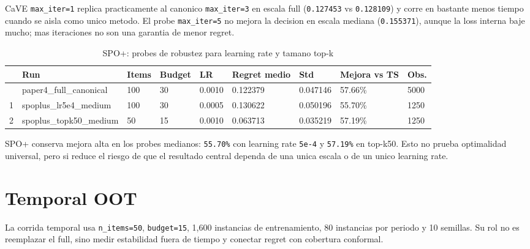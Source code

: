 \documentclass[
  spanish,
  11pt,
  letterpaper,
]{scrbook}
\theoremstyle{plain}
\theoremstyle{remark}
\begin{document}
CaVE \texttt{max\_iter=1} replica practicamente al canonico
\texttt{max\_iter=3} en escala full (\texttt{0.127453} vs
\texttt{0.128109}) y corre en bastante menos tiempo cuando se aisla como
unico metodo. El probe \texttt{max\_iter=5} no mejora la decision en
escala mediana (\texttt{0.155371}), aunque la loss interna baje mucho;
mas iteraciones no son una garantia de menor regret.

{

\begin{longtable}[]{@{}lllllllll@{}}

\caption{\label{tbl-p4-pyepo-spoplus-robustness}SPO+: probes de robustez
para learning rate y tamano top-k}

\tabularnewline

\toprule\noalign{}
& Run & Items & Budget & LR & Regret medio & Std & Mejora vs TS &
Obs. \\
\midrule\noalign{}
\endhead
\bottomrule\noalign{}
\endlastfoot
0 & paper4\_full\_canonical & 100 & 30 & 0.0010 & 0.122379 & 0.047146 &
57.66\% & 5000 \\
1 & spoplus\_lr5e4\_medium & 100 & 30 & 0.0005 & 0.130622 & 0.050196 &
55.70\% & 1250 \\
2 & spoplus\_topk50\_medium & 50 & 15 & 0.0010 & 0.063713 & 0.035219 &
57.19\% & 1250 \\

\end{longtable}

}

SPO+ conserva mejora alta en los probes medianos: \texttt{55.70\%} con
learning rate \texttt{5e-4} y \texttt{57.19\%} en top-k50. Esto no
prueba optimalidad universal, pero si reduce el riesgo de que el
resultado central dependa de una unica escala o de un unico learning
rate.

\section{Temporal OOT}\label{temporal-oot}

La corrida temporal usa \texttt{n\_items=50}, \texttt{budget=15}, 1,600
instancias de entrenamiento, 80 instancias por periodo y 10 semillas. Su
rol no es reemplazar el full, sino medir estabilidad fuera de tiempo y
conectar regret con cobertura conformal.
\end{document}

